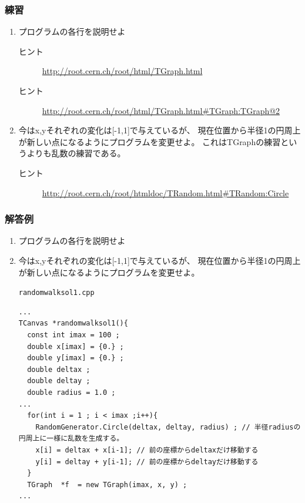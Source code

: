 \documentclass{jarticle}
\begin{document}
\subsubsection{練習}
\begin{enumerate}
 \item プログラムの各行を説明せよ
   \begin{description}
    \item[ヒント] \url{http://root.cern.ch/root/html/TGraph.html}
    \item[ヒント] \url{http://root.cern.ch/root/html/TGraph.html#TGraph:TGraph@2}
   \end{description}
 \item 今はx,yそれぞれの変化は[-1,1]で与えているが、
       現在位置から半径1の円周上が新しい点になるようにプログラムを変更せよ。
       これはTGraphの練習というよりも乱数の練習である。
   \begin{description}
    \item[ヒント] \url{http://root.cern.ch/root/htmldoc/TRandom.html#TRandom:Circle}
   \end{description}
       
\end{enumerate}

\subsubsection{解答例}

\begin{enumerate}
 \item プログラムの各行を説明せよ
 \item 今はx,yそれぞれの変化は[-1,1]で与えているが、
       現在位置から半径1の円周上が新しい点になるようにプログラムを変更せよ。
       \begin{itembox}{\texttt{randomwalksol1.cpp}}
\begin{verbatim}
...
TCanvas *randomwalksol1(){
  const int imax = 100 ;
  double x[imax] = {0.} ;
  double y[imax] = {0.} ;
  double deltax ;
  double deltay ;
  double radius = 1.0 ;
...
  for(int i = 1 ; i < imax ;i++){
    RandomGenerator.Circle(deltax, deltay, radius) ; // 半径radiusの円周上に一様に乱数を生成する。
    x[i] = deltax + x[i-1]; // 前の座標からdeltaxだけ移動する
    y[i] = deltay + y[i-1]; // 前の座標からdeltayだけ移動する
  }
  TGraph  *f  = new TGraph(imax, x, y) ;
...
\end{verbatim}
       \end{itembox}

\end{enumerate}
\end{document}
